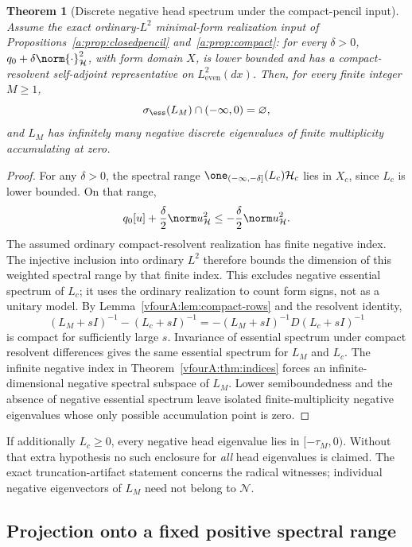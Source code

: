 \documentclass[11pt,a4paper]{article}
\numberwithin{equation}{section}
\newtheorem{theorem}{Theorem}[section]
\theoremstyle{definition}\newtheorem{definition}[theorem]{Definition}
\theoremstyle{remark}\newtheorem{remark}[theorem]{Remark}
\newcommand{\Hh}{\mathcal H}\newcommand{\Hw}{\mathcal H}
\newcommand{\Nn}{\mathcal N}\newcommand{\Ii}{\mathcal I}\newcommand{\Zz}{\mathcal Z}
\begin{document}
\begin{theorem}[Discrete negative head spectrum under the compact-pencil input]
\label{vfourA:thm:negative-spectrum}
Assume the exact ordinary-$L^2$ minimal-form realization input of
Propositions~\ref{a:prop:closedpencil} and~\ref{a:prop:compact}:
for every $\delta>0$, $q_0+\delta\norm{\cdot}_{\Hh}^2$, with form
domain $X$, is lower bounded and has a compact-resolvent
self-adjoint representative on $L^2_{\mathrm{even}}(dx)$.
Then, for every finite integer $M\ge1$,
\[
 \sigma_{\ess}(L_M)\cap(-\infty,0)=\varnothing,
\]
and $L_M$ has infinitely many negative discrete eigenvalues of finite
multiplicity accumulating at zero.
\end{theorem}
\begin{proof}
For any $\delta>0$, the spectral range
$\one_{(-\infty,-\delta]}(L_c)\Hh_c$ lies in $X_c$, since $L_c$ is
lower bounded.  On that range,
\[
 q_0[u]+\frac\delta2\norm u_{\Hh}^2
 \le-\frac\delta2\norm u_{\Hh}^2.
\]
The assumed ordinary compact-resolvent realization has finite negative
index.  The injective inclusion into ordinary $L^2$ therefore bounds
the dimension of this weighted spectral range by that finite index.
This excludes negative essential spectrum of $L_c$; it uses the
ordinary realization to count form signs, not as a unitary model.
By Lemma~\ref{vfourA:lem:compact-rows} and the resolvent identity,
\[
 (L_M+sI)^{-1}-(L_c+sI)^{-1}
 =-(L_M+sI)^{-1}D(L_c+sI)^{-1}
\]
is compact for sufficiently large $s$.  Invariance of essential
spectrum under compact resolvent differences gives the same
essential spectrum for $L_M$ and $L_c$.
The infinite negative index in Theorem~\ref{vfourA:thm:indices}
forces an infinite-dimensional negative spectral subspace of $L_M$.
Lower semiboundedness and the absence of negative essential spectrum
leave isolated finite-multiplicity negative eigenvalues whose only
possible accumulation point is zero.
\end{proof}

If additionally $L_c\ge0$, every negative head eigenvalue lies in
$[-\tau_M,0)$.  Without that extra hypothesis no such enclosure for
\emph{all} head eigenvalues is claimed.  The exact truncation-artifact
statement concerns the radical witnesses; individual negative
eigenvectors of $L_M$ need not belong to $\Nn$.

\subsection{Projection onto a fixed positive spectral range}
\label{vfourA:subsec:projection}
\end{document}
